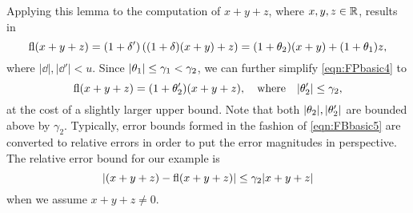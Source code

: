 Applying this lemma to the computation of $x+y+z$, where $x,y,z\in\mathbb{R}$, results in
\begin{equation}
\fl(x+y+z) = (1+\dd')\left((1+\dd) (x+y) +z\right) = (1+\tth_{2})(x+y) + (1+\tth_{1})z, \label{eqn:FPbasic4}
\end{equation}
where $|\dd|,|\dd'|<u$. 
Since $|\theta_{1}| \leq \gamma_{1} < \gamma_{2}$, we can further simplify \cref{eqn:FPbasic4} to
\begin{equation}
\fl(x+y+z) = (1+\tth'_{2})(x+y+z), \quad \mbox{where} \quad |\tth'_{2}| \leq \gamma_{2}, \label{eqn:FBbasic5}
\end{equation}
at the cost of a slightly larger upper bound. 
Note that both $|\theta_2|,|\theta'_2|$ are bounded above by $\gamma_2$.
Typically, error bounds formed in the fashion of \cref{eqn:FBbasic5} are converted to relative errors in order to put the error magnitudes in perspective.
The relative error bound for our example is
\begin{equation*}
|(x+y+z) - \mathrm{fl}(x+y+z)|\leq \gamma_{2}|x+y+z|
\end{equation*}
when we assume $x+y+z\neq 0$.\par

